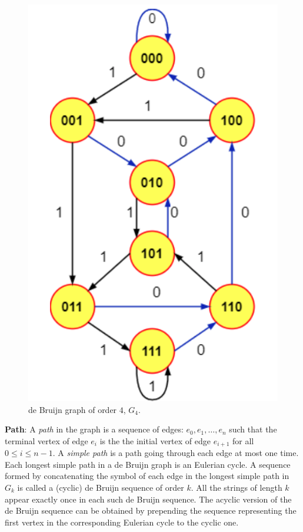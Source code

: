 \begin{figure}[htbp]
    \centering
    \includegraphics[scale=.3]{fig/dB4.png}
    \caption{de Bruijn graph of order $4$, $G_{4}$.}
    \label{fig:dB4}
\end{figure}

\textbf{Path}: A \textit{path} in the graph is a sequence of edges: $e_{0},e_{1},\ldots,e_{n}$ such that the terminal vertex of edge $e_{i}$ is the the initial vertex of edge $e_{i+1}$ for all $0\leq i\leq n-1$. A \textit{simple path} is a path going through each edge at most one time. Each longest simple path in a de Bruijn graph is an Eulerian cycle. A sequence formed by concatenating the symbol of each edge in the longest simple path in $G_{k}$ is called a (cyclic) de Bruijn sequence of order $k$. All the strings of length $k$ appear exactly once in each such de Bruijn sequence. The acyclic version of the de Bruijn sequence can be obtained by prepending the sequence representing the first vertex in the corresponding Eulerian cycle to the cyclic one. 


